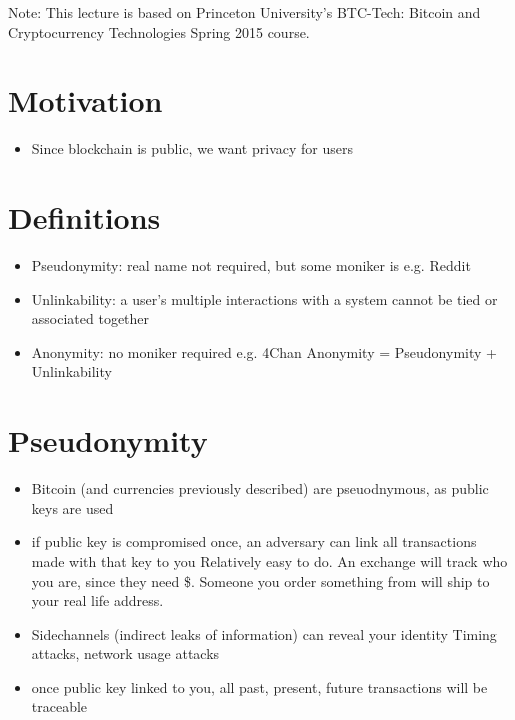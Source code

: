 \documentclass{article}
\begin{document}
\maketitle

Note: This lecture is based on Princeton University's BTC-Tech: Bitcoin and Cryptocurrency Technologies Spring 2015 course.

\section{Motivation}
\begin{itemize}
\item Since blockchain is public, we want privacy for users
\end{itemize}



\section{Definitions}
\begin{itemize}
\item Pseudonymity: real name not required, but some moniker is e.g. Reddit
\item Unlinkability: a user's multiple interactions with a system cannot be tied or associated together
\item Anonymity: no moniker required e.g. 4Chan
\subitem Anonymity = Pseudonymity + Unlinkability
\end{itemize}

\section{Pseudonymity}
\begin{itemize}
\item Bitcoin (and currencies previously described) are pseuodnymous, as public keys are used
\item if public key is compromised once, an adversary can link all transactions made with that key to you
\subitem Relatively easy to do. An exchange will track who you are, since they need \$. Someone you order something from will ship to your real life address.
\item Sidechannels (indirect leaks of information) can reveal your identity
\subitem Timing attacks, network usage attacks
\item once public key linked to you, all past, present, future transactions will be traceable
\end{itemize}
\end{document}
